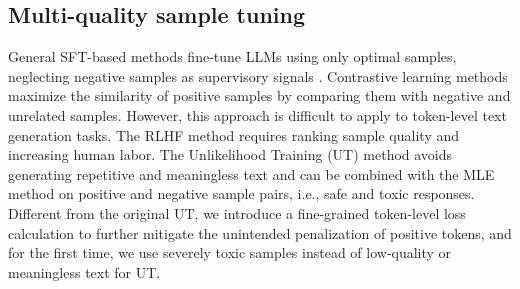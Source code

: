 \subsection{Multi-quality sample tuning}
General SFT-based methods fine-tune LLMs using only optimal samples, neglecting negative samples as supervisory signals \cite{nozawa2021understanding, wang2024learning}. Contrastive learning \cite{tian2020makes} methods maximize the similarity of positive samples by comparing them with negative and unrelated samples. However, this approach is difficult to apply to token-level text generation tasks. The RLHF method requires ranking sample quality and increasing human labor. The Unlikelihood Training (UT) \cite{welleck2020neural} method avoids generating repetitive and meaningless text and can be combined with the MLE method on positive and negative sample pairs, i.e., safe and toxic responses. Different from the original UT, we introduce a fine-grained token-level loss calculation to further mitigate the unintended penalization of positive tokens, and for the first time, we use severely toxic samples instead of low-quality or meaningless text for UT.